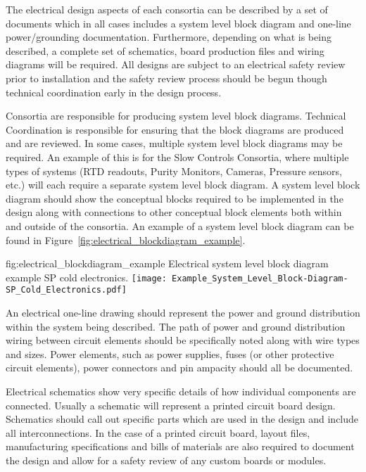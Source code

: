 The electrical design aspects of each consortia can be described by a
set of documents which in all cases includes a system level block
diagram and one-line power/grounding documentation.  Furthermore,
depending on what is being described, a complete set of schematics,
board production files and wiring diagrams will be required.  All
designs are subject to an electrical safety review prior to
installation and the safety review process should be begun though
technical coordination early in the design process.

Consortia are responsible for producing system level block
diagrams. Technical Coordination is responsible for ensuring that the
block diagrams are produced and are reviewed.  In some cases, multiple
system level block diagrams may be required.  An example of this is
for the Slow Controls Consortia, where multiple types of systems (RTD
readouts, Purity Monitors, Cameras, Pressure sensors, etc.) will each
require a separate system level block diagram. A system level block
diagram should show the conceptual blocks required to be implemented
in the design along with connections to other conceptual block
elements both within and outside of the consortia.  An example of a
system level block diagram can be found in
Figure~\ref{fig:electrical_blockdiagram_example}.
\begin{dunefigure}{fig:electrical_blockdiagram_example}
  {Electrical system level block diagram example SP cold electronics.}
 \texttt{[image: Example\_System\_Level\_Block-Diagram-SP\_Cold\_Electronics.pdf]}
\end{dunefigure}

An electrical one-line drawing should represent the power and ground
distribution within the system being described.  The path of power and
ground distribution wiring between circuit elements should be
specifically noted along with wire types and sizes.  Power elements,
such as power supplies, fuses (or other protective circuit elements),
power connectors and pin ampacity should all be documented.

Electrical schematics show very specific details of how individual
components are connected.  Usually a schematic will represent a
printed circuit board design.  Schematics should call out specific
parts which are used in the design and include all interconnections.
In the case of a printed circuit board, layout files, manufacturing
specifications and bills of materials are also required to document
the design and allow for a safety review of any custom boards or
modules.

